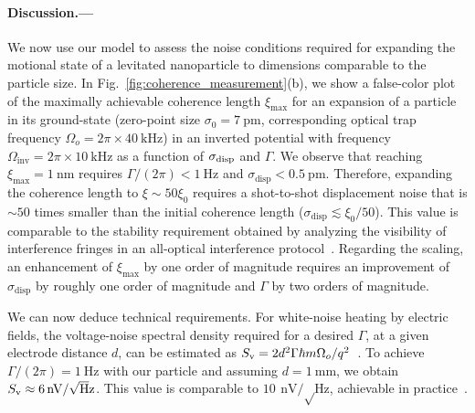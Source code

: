 \documentclass[aps,prl,reprint,twocolumn,superscriptaddress]{revtex4-2}
\begin{document}
\paragraph{Discussion.---}
We now use our model to assess the noise conditions required for expanding the motional state of a levitated nanoparticle to dimensions comparable to the particle size.
In Fig.~\ref{fig:coherence_measurement}(b), we show a false-color plot of the maximally achievable coherence length $\xi_\text{max}$ for an expansion of a particle in its ground-state (zero-point size $\sigma_0= \SI{7}{\pico\meter}$, corresponding optical trap frequency $\Omega_o=2\pi\times\SI{40}{\kilo\hertz}$) in an inverted potential with frequency $\Omega_{\mathrm{inv}} = 2\pi \times \SI{10}{\kilo\hertz}$ as a function of $\sigma_{\rm disp}$ and $\Gamma$.
We observe that reaching $\xi_\text{max} = \SI{1}{\nano\meter}$ requires $\Gamma/(2\pi) < \SI{1}{\hertz}$ and $\sigma_{\mathrm{disp}} < \SI{0.5}{\pico\meter}$. 
Therefore, expanding the coherence length to $\xi\sim50 \xi_0$ requires a shot-to-shot displacement noise that is $\sim 50$ times smaller than the initial coherence length ($\sigma_\text{disp} \lesssim \xi_0/50$).
This value is comparable to the stability requirement obtained by analyzing the visibility of interference fringes in an all-optical interference protocol~\cite{neumeier2024fast}.
Regarding the scaling, an enhancement of $\xi_\text{max}$ by one order of magnitude requires an improvement of $\sigma_{\mathrm{disp}}$ by roughly one order of magnitude and $\Gamma$ by two orders of magnitude.
%


We can now deduce technical requirements. 
For white-noise heating by electric fields, the voltage-noise spectral density required for a desired $\Gamma$, at a given electrode distance $d$, can be estimated as $S_{\rm v} = 2d^2\Gamma \hbar m \Omega_o/q^2$~\cite{brownnutt2015ion}. To achieve $\Gamma/(2\pi) = \SI{1}{\hertz}$ with our particle and assuming $d = \SI{1}{\milli\meter}$, we obtain $S_{\rm v} \approx \SI{6}{\nano\volt\per\sqrt\hertz}$. This value is comparable to $\SI{10}{\nano\volt\per\sqrt\hertz}$, achievable in practice~\cite{dania2024ultrahigh,vinante2019testing}.
\end{document}
